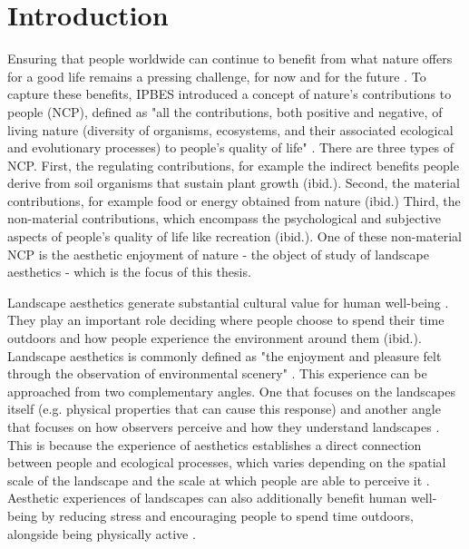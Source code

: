 \documentclass[11pt]{article}
\renewcommand{\_}{\textunderscore\allowbreak{}}
\begin{document}


\tableofcontents
\newpage                

\setcounter{page}{1}
\section{Introduction}\label{sec:Introduction}
Ensuring that people worldwide can continue to benefit from what nature offers for a good life remains a pressing challenge, for now and for the future \citep{Diaz2015,Diaz2018}. To capture these benefits, IPBES introduced a concept of nature's contributions to people (NCP), defined as "all the contributions, both positive and negative, of living nature (diversity of organisms, ecosystems, and their associated ecological and evolutionary processes) to people's quality of life" \citep{Diaz2018}. There are three types of NCP. First, the regulating contributions, for example the indirect benefits people derive from soil organisms that sustain plant growth (ibid.). Second, the material contributions, for example food or energy obtained from nature (ibid.) Third, the non-material contributions, which encompass the psychological and subjective aspects of people's quality of life like recreation (ibid.). One of these non-material NCP is the aesthetic enjoyment of nature \citep{Bruley2021} - the object of study of landscape aesthetics - which is the focus of this thesis.

Landscape aesthetics generate substantial cultural value for human well-being \citep{havinga_social_2021}. They play an important role deciding where people choose to spend their time outdoors and how people experience the environment around them (ibid.). Landscape aesthetics is commonly defined as "the enjoyment and pleasure felt through the observation of environmental scenery" \citep{tribot_integrating_2018}. This experience can be approached from two complementary angles. One that focuses on the landscapes itself (e.g. physical properties that can cause this response) and another angle that focuses on how observers perceive and how they understand landscapes \citep{tribot_integrating_2018}. This is because the experience of aesthetics establishes a direct connection between people and ecological processes, which varies depending on the spatial scale of the landscape and the scale at which people are able to perceive it \citep{tribot_integrating_2018,gobster_shared_2007}. Aesthetic experiences of landscapes can also additionally benefit human well-being by reducing stress and encouraging people to spend time outdoors, alongside being physically active \citep{gobster_shared_2007}.
\end{document}
